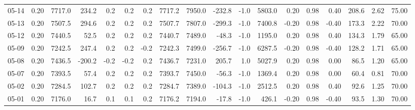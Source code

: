 \begin{threeparttable}
{\begin{tabular}{lrrrrrrrrrrrrrrrrr}
  05-14 &     0.20 & 7717.0 &             234.2 &               0.2 &                0.2 &                0.2 & 7717.2 & 7950.0 &     -232.8 &                     -1.0 &              5803.0 &       0.20 &      0.98 &           0.40 &            208.6 &            2.62 &                  75.00 \\
  05-13 &     0.20 & 7507.5 &             294.6 &               0.2 &                0.2 &                0.2 & 7507.7 & 7807.0 &     -299.3 &                     -1.0 &              7400.8 &      -0.20 &      0.98 &          -0.40 &            173.3 &            2.22 &                  70.00 \\
  05-12 &     0.20 & 7440.5 &              52.5 &               0.2 &                0.2 &                0.2 & 7440.7 & 7489.0 &      -48.3 &                     -1.0 &              1195.0 &       0.20 &      0.98 &           0.40 &            134.3 &            1.79 &                  65.00 \\
  05-09 &     0.20 & 7242.5 &             247.4 &               0.2 &                0.2 &               -0.2 & 7242.3 & 7499.0 &     -256.7 &                     -1.0 &              6287.5 &      -0.20 &      0.98 &          -0.40 &            128.2 &            1.71 &                  65.00 \\
  05-08 &     0.20 & 7436.5 &            -200.2 &              -0.2 &               -0.2 &                0.2 & 7436.7 & 7231.0 &      205.7 &                      1.0 &              5027.9 &       0.20 &      0.98 &           0.00 &             86.5 &            1.20 &                  65.00 \\
  05-07 &     0.20 & 7393.5 &              57.4 &               0.2 &                0.2 &                0.2 & 7393.7 & 7450.0 &      -56.3 &                     -1.0 &              1369.4 &       0.20 &      0.98 &           0.00 &             60.4 &            0.81 &                  70.00 \\
  05-02 &     0.20 & 7284.5 &             102.7 &               0.2 &                0.2 &                0.2 & 7284.7 & 7389.0 &     -104.3 &                     -1.0 &              2512.5 &       0.20 &      0.98 &           0.40 &             92.6 &            1.25 &                  70.00 \\
  05-01 &     0.20 & 7176.0 &              16.7 &               0.1 &                0.1 &                0.2 & 7176.2 & 7194.0 &      -17.8 &                     -1.0 &               426.1 &      -0.20 &      0.98 &          -0.40 &             93.5 &            1.30 &                  70.00 \\

\end{tabular}}
\end{threeparttable}
